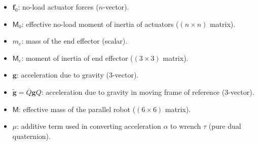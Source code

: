 \documentclass[reqno,12pt]{amsart}
\begin{document}
\begin{itemize}
\item $\bm f_0$: no-load actuator forces ($n$-vector).
\item $\mathsf M_0$: effective no-load moment of inertia of actuators ($(n\times n)$ matrix).
\item $m_e$: mass of the end effector (scalar).
\item $\mathsf M_e$: moment of inertia of end effector ($(3\times3)$ matrix).
\item $\bm g$: acceleration due to gravity (3-vector).
\item $\tilde{\bm g} = \overline Q \bm g Q$: acceleration due to gravity in moving frame of reference (3-vector).
\item $\mathsf M$: effective mass of the parallel robot ($(6\times6)$ matrix).
\item $\mu$: additive term used in converting acceleration $\alpha$ to wrench $\tau$ (pure dual quaternion).
\end{itemize}
\end{document}
